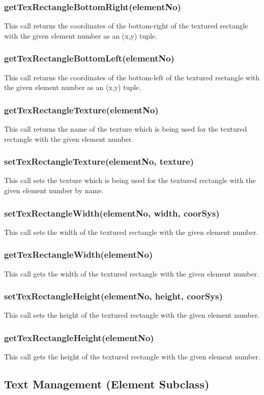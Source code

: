 \documentclass{acm_proc_article-sp}
\begin{document}
\subsubsection{getTexRectangleBottomRight(elementNo)}
This call returns the coordinates of the bottom-right of the textured rectangle with the given element number as an (x,y) tuple.
\subsubsection{getTexRectangleBottomLeft(elementNo)}
This call returns the coordinates of the bottom-left of the textured rectangle with the given element number as an (x,y) tuple.
\subsubsection{getTexRectangleTexture(elementNo)}
This call returns the name of the texture which is being used for the textured rectangle with the given element number.
\subsubsection{setTexRectangleTexture(elementNo, texture)}
This call sets the texture which is being used for the textured rectangle with the given element number by name.
\subsubsection{setTexRectangleWidth(elementNo, width, coorSys)}
This call sets the width of the textured rectangle with the given element number.
\subsubsection{getTexRectangleWidth(elementNo)}
This call gets the width of the textured rectangle with the given element number.
\subsubsection{setTexRectangleHeight(elementNo, height, coorSys)}
This call sets the height of the textured rectangle with the given element number.
\subsubsection{getTexRectangleHeight(elementNo)}
This call gets the height of the textured rectangle with the given element number.
\subsection{Text Management (Element Subclass)}
\end{document}
